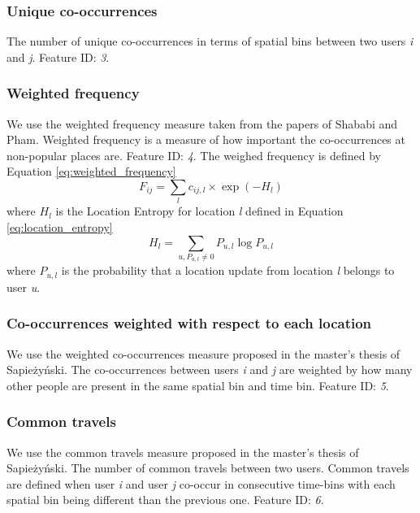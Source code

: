 \subsubsection{Unique co-occurrences}
The number of unique co-occurrences in terms of spatial bins between two users \textit{i} and \textit{j}. Feature ID: \textit{3}.

\subsubsection{Weighted frequency}
We use the weighted frequency measure taken from the papers of Shababi and Pham\cite{iRWRfSD}\cite{AEBMtISSfSD}.
Weighted frequency is a measure of how important the co-occurrences at non-popular places are. Feature ID: \textit{4}.
The weighed frequency is defined by Equation \ref{eq:weighted_frequency}
\begin{equation}
\label{eq:weighted_frequency}
F_{ij}=\sum\limits_{l}c_{ij,l} \times \exp(-H_l)
\end{equation}
where $H_l$ is the Location Entropy for location \textit{l} defined in Equation \ref{eq:location_entropy}
\begin{equation}
\label{eq:location_entropy}
H_l = \sum\limits_{u, P_{u,l}\neq0} P_{u,l}\log P_{u,l}
\end{equation}
where $P_{u,l}$ is the probability that a location update from location \textit{l} belongs to user \textit{u}.

\subsubsection{Co-occurrences weighted with respect to each location}
We use the weighted co-occurrences measure proposed in the master's thesis of Sapieżyński\cite{IMM2013-06556}.
The co-occurrences between users \textit{i} and \textit{j} are weighted by how many other people are present in the same spatial bin and time bin.
Feature ID: \textit{5}.

\subsubsection{Common travels}
We use the common travels measure proposed in the master's thesis of Sapieżyński\cite{IMM2013-06556}.
The number of common travels between two users. Common travels are defined when user \textit{i} and user \textit{j} co-occur in consecutive time-bins with each spatial bin being different than the previous one. Feature ID: \textit{6}.


